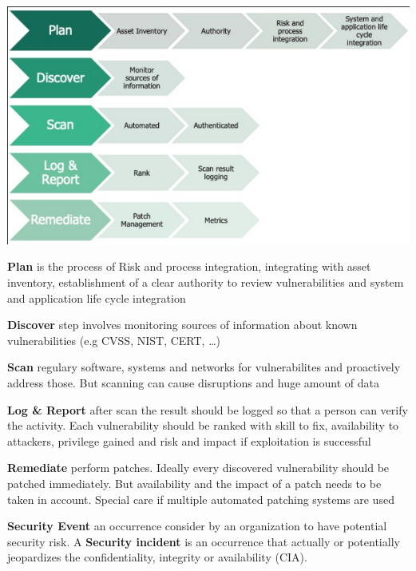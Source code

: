 \documentclass[11pt,twoside,landscape]{article}
\begin{document}
\begin{multicols}{4}
\begin{center}
\includegraphics[width=.9\linewidth]{static/img/cysec/vulnerability_management_steps.png}
\end{center}

\textbf{Plan} is the process of Risk and process integration, integrating with asset inventory, establishment of a clear authority to review vulnerabilities and system and application life cycle integration

\textbf{Discover} step involves monitoring sources of information about known vulnerabilities (e.g CVSS, NIST, CERT, \ldots{})

\textbf{Scan} regulary software, systems and networks for vulnerabilites and proactively address those. But scanning can cause disruptions and huge amount of data

\textbf{Log \& Report} after scan the result should be logged so that a person can verify the activity. Each vulnerability should be ranked with skill to fix, availability to attackers, privilege gained and risk and impact if exploitation is successful

\textbf{Remediate} perform patches. Ideally every discovered vulnerability should be patched immediately. But availability and the impact of a patch needs to be taken in account. Special care if multiple automated patching systems are used


\textbf{Security Event} an occurrence consider by an organization to have potential security risk. A \textbf{Security incident} is an occurrence that actually or potentially jeopardizes the confidentiality, integrity or availability (CIA).


\end{multicols}
\end{document}
